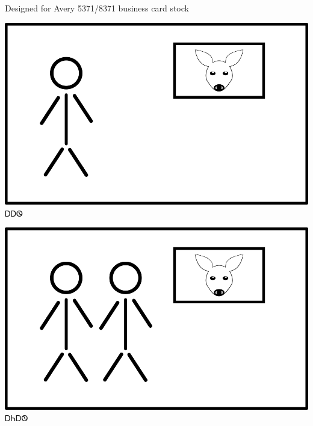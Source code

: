 \documentclass[avery8371]{flashcards}%
\begin{document}
    Designed for Avery 5371/8371 business card stock

    \begin{flashcard}{
        \includegraphics[width=0.95\columnwidth,height=.51\columnwidth,keepaspectratio]{../artwork/flags/aahwi-flag}
    }
        \Huge ᎠᎠᏫ
    \end{flashcard}
    \begin{flashcard}{
        \includegraphics[width=0.95\columnwidth,height=.51\columnwidth,keepaspectratio]{../artwork/flags/aniahwi-flag}
    }
        \Huge ᎠᏂᎠᏫ
    \end{flashcard}
\end{document}
